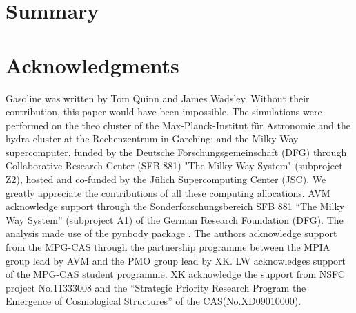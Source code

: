 \documentclass[useAMS,usenatbib]{mn2e}
\begin{document}
\section{Summary}
\label{sec:sum}



\section*{Acknowledgments} 

{\sc Gasoline} was written by Tom Quinn and James Wadsley. Without
their contribution, this paper would have been impossible.
The simulations were performed on the {\sc theo} cluster of the
Max-Planck-Institut f\"ur Astronomie and the {\sc hydra} cluster at
the Rechenzentrum in Garching; and the Milky Way supercomputer, funded
by the Deutsche Forschungsgemeinschaft (DFG) through Collaborative
Research Center (SFB 881) "The Milky Way System" (subproject Z2),
hosted and co-funded by the J\"ulich Supercomputing Center (JSC). We
greatly appreciate the contributions of all these computing
allocations. AVM acknowledge support through the
Sonderforschungsbereich SFB 881 “The Milky Way System” (subproject A1)
of the German Research Foundation (DFG).  The analysis made use of the
pynbody package \citep{Pontzen13}.
%
The authors acknowledge support from the MPG-CAS through the
partnership programme between the MPIA group lead by AVM and the PMO
group lead by XK.
LW acknowledges support of the MPG-CAS student
programme.
XK acknowledge the support from NSFC project
No.11333008 and the ``Strategic Priority Research Program the Emergence
of Cosmological Structures'' of the CAS(No.XD09010000).


\end{document}
